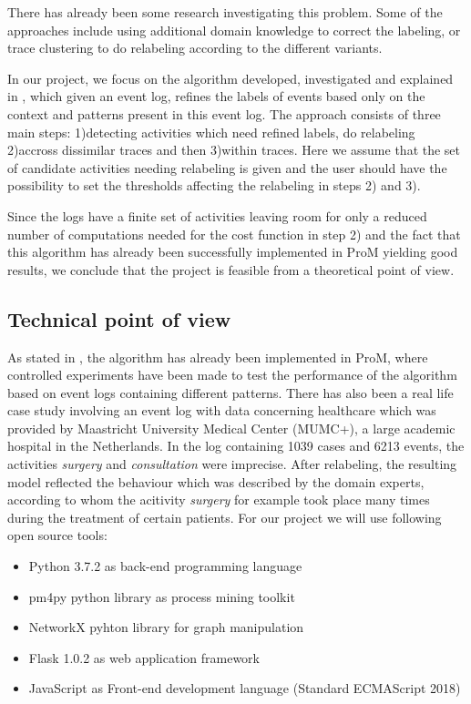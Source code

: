 \documentclass[notitlepage]{article}
\begin{document}
\begin{flushleft}
There has already been some research investigating this problem. 
Some of the approaches include using additional domain knowledge to correct the labeling, or trace clustering to do relabeling according to the different variants.

In our project, we focus on the algorithm developed, investigated and explained in \cite{paper}, which given an event log, refines the labels of events based only on the context and patterns present in this event log.
The approach consists of three main steps: 1)detecting activities which need refined labels, do relabeling 2)accross dissimilar traces and then 3)within traces.
Here we assume that the set of candidate activities needing relabeling is given and the user should have the possibility to set the thresholds affecting the relabeling in steps 2) and 3).

Since the logs have a finite set of activities leaving room for only a reduced number of computations needed for the cost function in step 2) and the fact that this algorithm has already been successfully implemented in ProM yielding good results, we conclude that the project is feasible from a theoretical point of view.\\

\subsection{Technical point of view}

As stated in \cite{paper}, the algorithm has already been implemented in ProM, where controlled experiments have been made to test the performance of the algorithm based on event logs containing different patterns.
There has also been a real life case study involving an event log with data concerning healthcare which was provided by Maastricht University Medical Center (MUMC+), a large academic hospital in the Netherlands.
In the log containing 1039 cases and 6213 events, the activities \textit{surgery} and \textit{consultation} were imprecise.
After relabeling, the resulting model reflected the behaviour which was described by the domain experts, according to whom the acitivity \textit{surgery} for example took place many times during the treatment of certain patients.
\medskip
For our project we will use following open source tools: 
\medskip
\begin{itemize}
	\item Python 3.7.2 as back-end programming language
	\item pm4py python library as process mining toolkit
  \item NetworkX pyhton library for graph manipulation
  \item Flask 1.0.2 as web application framework
	\item JavaScript as Front-end development language (Standard ECMAScript 2018)
\end{itemize}


\end{flushleft}
\end{document}
